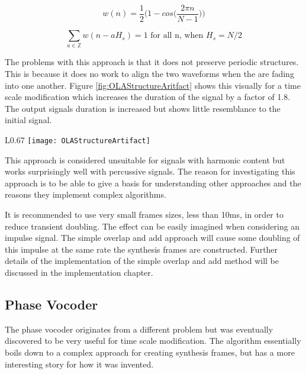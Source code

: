 \begin{equation}\label{eq:HanningWindow}
	w(n) =\frac{1}{2}\Bigg(1-cos\bigg(\frac{2\pi n}{N-1}\bigg)\Bigg)
\end{equation}

\begin{equation}\label{eq:HanningAmplitude}
\sum\limits_{a\in\mathbb{Z}} w(n-aH_s)=1 \text{ for all n, when } H_s = N/2
\end{equation}

The problems with this approach is that it does not preserve periodic structures.
This is because it does no work to align the two waveforms when the are fading
into one another. Figure \ref{fig:OLAStructureAritfact} shows this visually for a
time scale modification which increases the duration of the signal by a factor of
1.8.  The output signals duration is increased but shows little resemblance to the
initial signal.

\begin{wrapfigure}{L}{0.67\textwidth}
	\center
	\texttt{[image: OLAStructureArtifact]}
	\caption{OLA harmonic structure distortion\cite{TSMBook}}
	\label{fig:OLAStructureAritfact}
\end{wrapfigure}

This approach is considered unsuitable for signals with harmonic content but works
surprisingly well with percussive signals\cite{TSMBook}. The reason for
investigating this approach is to be able to give a basis for understanding other
approaches and the reasons they implement complex algorithms.

It is recommended to use very small frames sizes, less than 10ms, in order to
reduce transient doubling. The effect can be easily imagined when considering an
impulse signal. The simple overlap and add approach will cause some doubling of
this impulse at the same rate the synthesis frames are constructed. Further
details of the implementation of the simple overlap and add method will be
discussed in the implementation chapter.

\subsection{Phase Vocoder}

The phase vocoder originates from a different problem but was eventually
discovered to be very useful for time scale modification. The algorithm
essentially boils down to a complex approach for creating synthesis frames, but
has a more interesting story for how it was invented.

